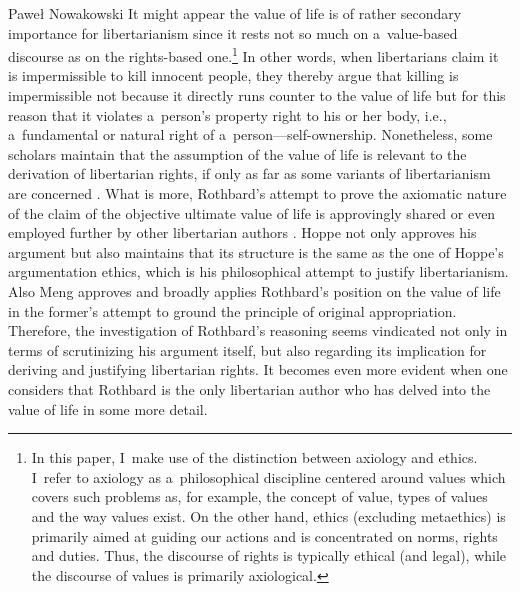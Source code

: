 \begin{artengenv}{Paweł Nowakowski}
It might appear the value of life is of rather secondary importance for libertarianism since it rests not so much on a~value-based discourse as on the rights-based one.\footnote{In this paper, I~make use of the distinction between axiology and ethics. I~refer to axiology as a~philosophical discipline centered around values which covers such problems as, for example, the concept of value, types of values and the way values exist. On the other hand, ethics (excluding metaethics) is primarily aimed at guiding our actions and is concentrated on norms, rights and duties. Thus, the discourse of rights is typically ethical (and legal), while the discourse of values is primarily axiological.} In other words, when libertarians claim it is impermissible to kill innocent people, they thereby argue that killing is impermissible not because it directly runs counter to the value of life but for this reason that it violates a~person's property right to his or her body, i.e., a~fundamental or natural right of a~person---self-ownership. Nonetheless, some scholars maintain that the assumption of the value of life is relevant to the derivation of libertarian rights, if only as far as some variants of libertarianism are concerned 
\parencites[see][p.115]{Harris2002Rights}[][pp.xxxiv–xxxv]{Hoppe1998Introduction}[][p.14]{Mack2022Natural}[][]{Meng2002Hoppeing}[][]{Osterfeld1983Natural}[][pp.60–61]{Osterfeld1986Freedom}[][]{Rasmussen1980Groundwork}[][p.134ff]{Share2012Defense}[][p.29]{Slenzok2018Dwa}[][p.217]{Thrasher2018Social}[][p.294]{Wissenburg2019Concept}. %
 What is more, Rothbard's attempt to prove the axiomatic nature of the claim of the objective ultimate value of life is approvingly shared or even employed further by other libertarian authors 
\parencites[see][]{Hoppe1988From}[][pp.xxxiv–xxxv]{Hoppe1998Introduction}[][]{Meng2002Hoppeing}[][]{Rasmussen1980Groundwork}. %
 Hoppe 
\parencite*[][p.66]{Hoppe1988From} %
 not only approves his argument but also maintains that its structure is the same as the one of Hoppe's argumentation ethics, which is his philosophical attempt to justify libertarianism. Also Meng 
\parencite*[][]{Meng2002Hoppeing} %
 approves and broadly applies Rothbard's position on the value of life in the former's attempt to ground the principle of original appropriation. Therefore, the investigation of Rothbard's reasoning seems vindicated not only in terms of scrutinizing his argument itself, but also regarding its implication for deriving and justifying libertarian rights. It becomes even more evident when one considers that Rothbard is the only libertarian author who has delved into the value of life in some more detail.


\end{artengenv}
